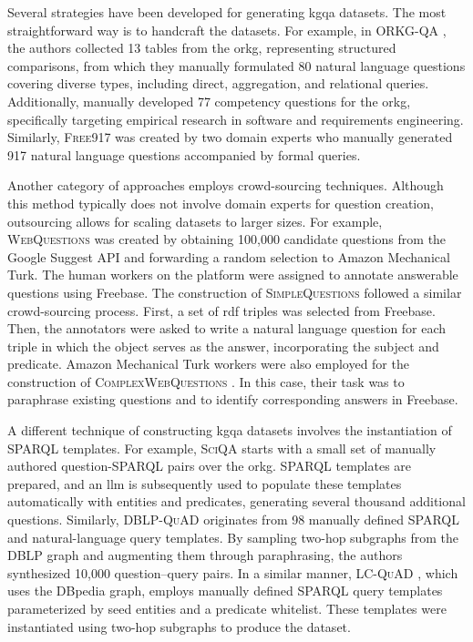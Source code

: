 Several strategies have been developed for generating \gls{kgqa} datasets. The most straightforward way is to handcraft the datasets. For example, in \textsc{ORKG-QA} \cite{jaradeh_question_2020},  the authors collected 13 tables from the \gls{orkg}, representing structured comparisons, from which they manually formulated 80 natural language questions covering diverse types, including direct, aggregation, and relational queries. Additionally, \textcite{karras_divide_2023} manually developed 77 competency questions for the \gls{orkg}, specifically targeting empirical research in software and requirements engineering. Similarly, \textsc{Free917} \cite{cai_large-scale_2013} was created by two domain experts who manually generated 917 natural language questions accompanied by formal queries.

Another category of approaches employs crowd-sourcing techniques. Although this method typically does not involve domain experts for question creation, outsourcing allows for scaling datasets to larger sizes. For example, \textsc{WebQuestions} \cite{berant_semantic_2013} was created by obtaining 100,000 candidate questions from the Google Suggest API and forwarding a random selection to Amazon Mechanical Turk. The human workers on the platform were assigned to annotate answerable questions using Freebase. The construction of \textsc{SimpleQuestions} \cite{bordes_large-scale_2015} followed a similar crowd-sourcing process. First, a set of \gls{rdf} triples was selected from Freebase. Then, the annotators were asked to write a natural language question for each triple in which the object serves as the answer, incorporating the subject and predicate. Amazon Mechanical Turk workers were also employed for the construction of \textsc{ComplexWebQuestions} \cite{talmor_web_2018}. In this case, their task was to paraphrase existing questions and to identify corresponding answers in Freebase.

A different technique of constructing \gls{kgqa} datasets involves the instantiation of SPARQL templates. For example, \textsc{SciQA} \cite{auer_sciqa_2023} starts with a small set of manually authored question-SPARQL pairs over the \gls{orkg}. SPARQL templates are prepared, and an \gls{llm} is subsequently used to populate these templates automatically with entities and predicates, generating several thousand additional questions. Similarly, \textsc{DBLP-QuAD} \cite{banerjee_dblp-quad_2023} originates from 98 manually defined SPARQL and natural-language query templates. By sampling two-hop subgraphs from the DBLP graph and augmenting them through paraphrasing, the authors synthesized 10,000 question–query pairs. In a similar manner, \textsc{LC-QuAD} \cite{trivedi_lc-quad_2017}, which uses the DBpedia graph, employs manually defined SPARQL query templates parameterized by seed entities and a predicate whitelist. These templates were instantiated using two-hop subgraphs to produce the dataset.

